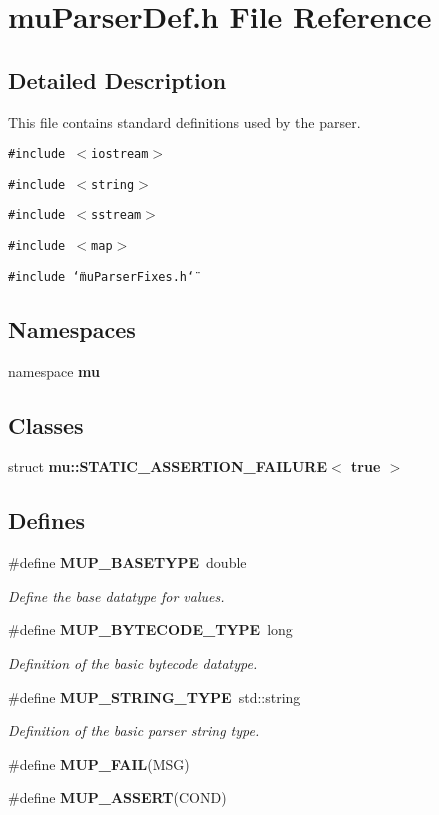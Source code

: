 \section{muParserDef.h File Reference}
\label{muParserDef_8h}


\subsection{Detailed Description}
This file contains standard definitions used by the parser. 



{\tt \#include $<$iostream$>$}\par
{\tt \#include $<$string$>$}\par
{\tt \#include $<$sstream$>$}\par
{\tt \#include $<$map$>$}\par
{\tt \#include \char`\"{}muParserFixes.h\char`\"{}}\par
\subsection*{Namespaces}
\begin{CompactItemize}
\item 
namespace {\bf mu}
\end{CompactItemize}
\subsection*{Classes}
\begin{CompactItemize}
\item 
struct {\bf mu::STATIC\_\-ASSERTION\_\-FAILURE$<$ true $>$}
\end{CompactItemize}
\subsection*{Defines}
\begin{CompactItemize}
\item 
\#define {\bf MUP\_\-BASETYPE}~double
\begin{CompactList}\small\item\em Define the base datatype for values. \item\end{CompactList}\item 
\#define {\bf MUP\_\-BYTECODE\_\-TYPE}~long
\begin{CompactList}\small\item\em Definition of the basic bytecode datatype. \item\end{CompactList}\item 
\#define {\bf MUP\_\-STRING\_\-TYPE}~std::string
\begin{CompactList}\small\item\em Definition of the basic parser string type. \item\end{CompactList}\item 
\#define {\bf MUP\_\-FAIL}(MSG)
\item 
\#define {\bf MUP\_\-ASSERT}(COND)
\end{CompactItemize}
